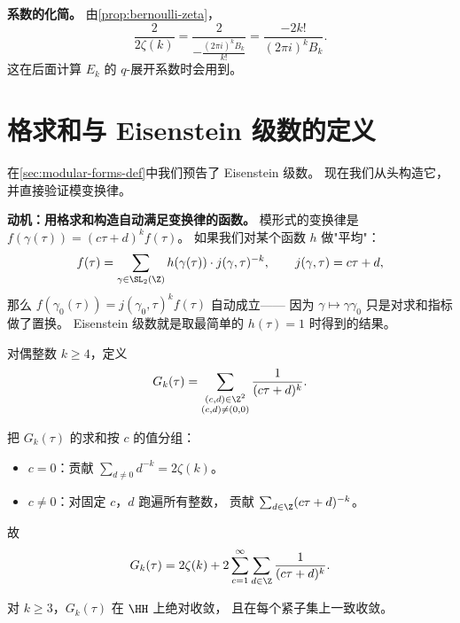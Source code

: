 \textbf{系数的化简。}
由\cref{prop:bernoulli-zeta}，
\[
  \frac{2}{2\zeta(k)} = \frac{2}{-\frac{(2\pi i)^k B_k}{k!}}
  = \frac{-2k!}{(2\pi i)^k B_k}.
\]
这在后面计算 $E_k$ 的 $q$-展开系数时会用到。


\section{格求和与 Eisenstein 级数的定义}
\label{sec:lattice-sum-eisenstein}

在\cref{sec:modular-forms-def}中我们预告了 Eisenstein 级数。
现在我们从头构造它，并直接验证模变换律。

\textbf{动机：用格求和构造自动满足变换律的函数。}
模形式的变换律是 $f(\gamma(\tau)) = (c\tau + d)^k f(\tau)$。
如果我们对某个函数 $h$ 做"平均"：
\[
  f(\tau) = \sum_{\gamma \in \SL_2(\Z)} h(\gamma(\tau)) \cdot j(\gamma, \tau)^{-k},
  \qquad j(\gamma, \tau) = c\tau + d,
\]
那么 $f(\gamma_0(\tau)) = j(\gamma_0, \tau)^k f(\tau)$ 自动成立——
因为 $\gamma \mapsto \gamma\gamma_0$ 只是对求和指标做了置换。
Eisenstein 级数就是取最简单的 $h(\tau) = 1$ 时得到的结果。

\begin{definition}[Eisenstein 级数 $G_k$]
\label{def:eisenstein-Gk}
对偶整数 $k \geq 4$，定义
\[
  G_k(\tau) = \sum_{\substack{(c,d) \in \Z^2 \\ (c,d) \neq (0,0)}}
  \frac{1}{(c\tau + d)^k}.
\]
\end{definition}

\begin{example}[前几项展开]
\label{ex:Gk-first-terms}
把 $G_k(\tau)$ 的求和按 $c$ 的值分组：
\begin{itemize}
  \item $c = 0$：贡献 $\sum_{d \neq 0} d^{-k} = 2\zeta(k)$。
  \item $c \neq 0$：对固定 $c$，$d$ 跑遍所有整数，
    贡献 $\sum_{d \in \Z} (c\tau + d)^{-k}$。
\end{itemize}
故
\[
  G_k(\tau) = 2\zeta(k) + 2 \sum_{c=1}^{\infty} \sum_{d \in \Z} \frac{1}{(c\tau + d)^k}.
\]
\end{example}

\begin{proposition}[绝对收敛性]
\label{prop:Gk-convergence}
对 $k \geq 3$，$G_k(\tau)$ 在 $\HH$ 上绝对收敛，
且在每个紧子集上一致收敛。
\end{proposition}

